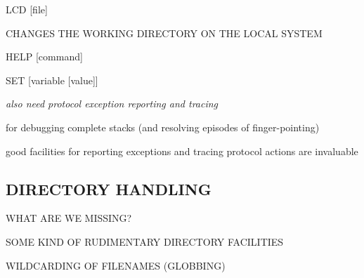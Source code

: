 \begin{bwslide}

\begin{nrtc}
\item	LCD [file]
    \begin{nrtc}
    \item	CHANGES THE WORKING DIRECTORY ON THE LOCAL SYSTEM
    \end{nrtc}

\item	HELP [command]

\item	SET [variable [value]]
\end{nrtc}
\end{bwslide}


\begin{note}\em
also need protocol exception reporting and tracing

for debugging complete stacks
(and resolving episodes of finger-pointing)

good facilities for reporting exceptions and tracing protocol actions
are invaluable
\end{note}


\begin{bwslide}
\part*	{DIRECTORY HANDLING}\bf

\begin{nrtc}
\item	WHAT ARE WE MISSING?

\item	SOME KIND OF RUDIMENTARY DIRECTORY FACILITIES

\item	WILDCARDING OF FILENAMES (GLOBBING)
\end{nrtc}
\end{bwslide}


